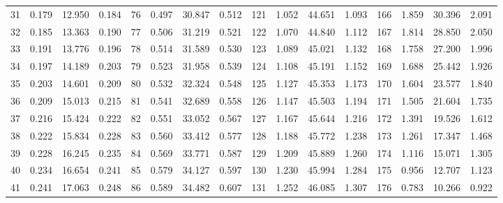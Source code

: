 \begin{table}[!h]
{\begin{tabular}{rrrr|rrrr|rrrr|rrrr}
 31 & \tiny{  0.179} &  12.950 & \tiny{  0.184} &  76 & \tiny{  0.497} &  30.847 & \tiny{  0.512} & 121 & \tiny{  1.052} &  44.651 & \tiny{  1.093} & 166 & \tiny{  1.859} &  30.396 & \tiny{  2.091}\\
 32 & \tiny{  0.185} &  13.363 & \tiny{  0.190} &  77 & \tiny{  0.506} &  31.219 & \tiny{  0.521} & 122 & \tiny{  1.070} &  44.840 & \tiny{  1.112} & 167 & \tiny{  1.814} &  28.850 & \tiny{  2.050}\\
 33 & \tiny{  0.191} &  13.776 & \tiny{  0.196} &  78 & \tiny{  0.514} &  31.589 & \tiny{  0.530} & 123 & \tiny{  1.089} &  45.021 & \tiny{  1.132} & 168 & \tiny{  1.758} &  27.200 & \tiny{  1.996}\\
 34 & \tiny{  0.197} &  14.189 & \tiny{  0.203} &  79 & \tiny{  0.523} &  31.958 & \tiny{  0.539} & 124 & \tiny{  1.108} &  45.191 & \tiny{  1.152} & 169 & \tiny{  1.688} &  25.442 & \tiny{  1.926}\\
 35 & \tiny{  0.203} &  14.601 & \tiny{  0.209} &  80 & \tiny{  0.532} &  32.324 & \tiny{  0.548} & 125 & \tiny{  1.127} &  45.353 & \tiny{  1.173} & 170 & \tiny{  1.604} &  23.577 & \tiny{  1.840}\\
 36 & \tiny{  0.209} &  15.013 & \tiny{  0.215} &  81 & \tiny{  0.541} &  32.689 & \tiny{  0.558} & 126 & \tiny{  1.147} &  45.503 & \tiny{  1.194} & 171 & \tiny{  1.505} &  21.604 & \tiny{  1.735}\\
 37 & \tiny{  0.216} &  15.424 & \tiny{  0.222} &  82 & \tiny{  0.551} &  33.052 & \tiny{  0.567} & 127 & \tiny{  1.167} &  45.644 & \tiny{  1.216} & 172 & \tiny{  1.391} &  19.526 & \tiny{  1.612}\\
 38 & \tiny{  0.222} &  15.834 & \tiny{  0.228} &  83 & \tiny{  0.560} &  33.412 & \tiny{  0.577} & 128 & \tiny{  1.188} &  45.772 & \tiny{  1.238} & 173 & \tiny{  1.261} &  17.347 & \tiny{  1.468}\\
 39 & \tiny{  0.228} &  16.245 & \tiny{  0.235} &  84 & \tiny{  0.569} &  33.771 & \tiny{  0.587} & 129 & \tiny{  1.209} &  45.889 & \tiny{  1.260} & 174 & \tiny{  1.116} &  15.071 & \tiny{  1.305}\\
 40 & \tiny{  0.234} &  16.654 & \tiny{  0.241} &  85 & \tiny{  0.579} &  34.127 & \tiny{  0.597} & 130 & \tiny{  1.230} &  45.994 & \tiny{  1.284} & 175 & \tiny{  0.956} &  12.707 & \tiny{  1.123}\\
 41 & \tiny{  0.241} &  17.063 & \tiny{  0.248} &  86 & \tiny{  0.589} &  34.482 & \tiny{  0.607} & 131 & \tiny{  1.252} &  46.085 & \tiny{  1.307} & 176 & \tiny{  0.783} &  10.266 & \tiny{  0.922}\\

\end{tabular}}
\end{table}
